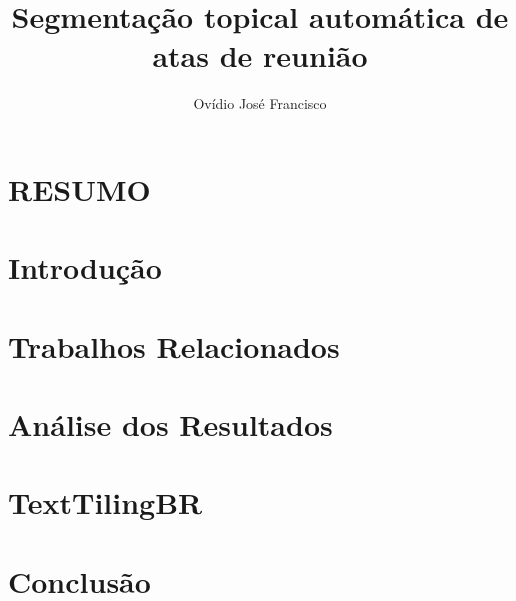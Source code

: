 \documentclass{sig-alternate-05-2015}
\begin{document}
\title{Segmentação topical automática de atas de reunião}



\author{
\alignauthor Ovídio José Francisco\\
}

\maketitle

%

\section*{RESUMO}



\keywords{}

\begingroup
\let\clearpage\relax

\section{Introdução}
	\label{sec:introducao}
	

\section{Trabalhos Relacionados}
	\label{sec:trabalhos}
	

\section{Análise dos Resultados}
	\label{sec:resultados}
	
	
\section{TextTilingBR}


\section{Conclusão}
	\label{sec:conclusao}
	
\endgroup




	
\pagestyle{empty}
 	\label{sec:anexo}
 	
\end{document}
